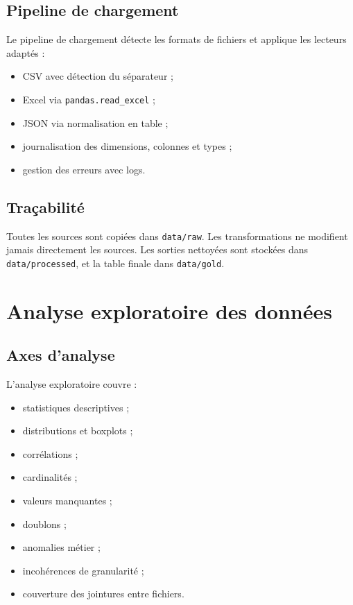 \documentclass[11pt,a4paper]{report}
\begin{document}
\section{Pipeline de chargement}

Le pipeline de chargement détecte les formats de fichiers et applique les lecteurs adaptés :

\begin{itemize}[leftmargin=*]
    \item CSV avec détection du séparateur ;
    \item Excel via \texttt{pandas.read\_excel} ;
    \item JSON via normalisation en table ;
    \item journalisation des dimensions, colonnes et types ;
    \item gestion des erreurs avec logs.
\end{itemize}

\section{Traçabilité}

Toutes les sources sont copiées dans \texttt{data/raw}. Les transformations ne modifient jamais directement les sources. Les sorties nettoyées sont stockées dans \texttt{data/processed}, et la table finale dans \texttt{data/gold}.

\chapter{Analyse exploratoire des données}

\section{Axes d'analyse}

L'analyse exploratoire couvre :

\begin{itemize}[leftmargin=*]
    \item statistiques descriptives ;
    \item distributions et boxplots ;
    \item corrélations ;
    \item cardinalités ;
    \item valeurs manquantes ;
    \item doublons ;
    \item anomalies métier ;
    \item incohérences de granularité ;
    \item couverture des jointures entre fichiers.
\end{itemize}
\end{document}
